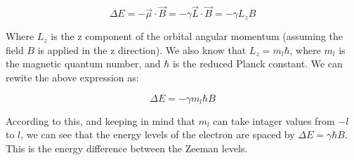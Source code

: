 \begin{equation}
    \Delta E = - \vec{\mu} \cdot \vec{B} = - \gamma \vec{L} \cdot \vec{B} = - \gamma L_z B
\end{equation}

Where $L_z$ is the z component of the orbital angular momentum (assuming the field $B$ is applied in the z direction). We also know that
$L_z = m_l \hbar$, where $m_l$ is the magnetic quantum number, and $\hbar$ is the reduced Planck constant. We can rewite the above expression as:

\begin{equation}
    \Delta E = - \gamma m_l \hbar B
\end{equation}

According to this, and keeping in mind that $m_l$ can take intager values from $-l$ to $l$, we can see that the energy levels of the electron
are spaced by $\Delta E = \gamma \hbar B$. This is the energy difference between the Zeeman levels.